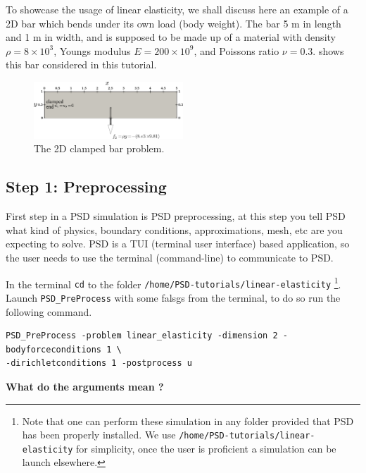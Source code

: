 \newcommand{\psd}[1]{{\small\color{blue!60}\texttt{#1}}}

To showcase the usage of linear elasticity, we shall discuss here an
example of a 2D bar which bends under its own load (body weight). The
bar 5 m in length and 1 m in width, and is supposed to be made up of a
material with density \(\rho=8\times 10^3\), Youngs modulus
\(E=200\times 10^9\), and Poissons ratio \(\nu=0.3\).
 shows this bar considered in this tutorial.

\begin{figure}[h!]
\centering
\includegraphics[width=0.5\textwidth]{./Images/le-2d-bar.png}
\caption{The 2D clamped bar problem. \label{2dbar-le-full}}
\end{figure}

\subsection{Step 1: Preprocessing}

First step in a PSD simulation is PSD preprocessing, at this step you
tell PSD what kind of physics, boundary conditions, approximations,
mesh, etc are you expecting to solve. PSD is a TUI (terminal user
interface) based application, so the user needs to use the terminal
(command-line) to communicate to PSD.

In the terminal \psd{cd} to the folder
\psd{/home/PSD-tutorials/linear-elasticity}
\footnote{Note that one can perform these simulation in any folder provided that PSD has been properly installed. We use \psd{/home/PSD-tutorials/linear-elasticity} for simplicity, once the user is proficient a simulation can be launch elsewhere.}.
Launch \psd{PSD\_PreProcess} with some falsgs from the terminal, to do
so run the following command.

\begin{lstlisting}[style=BashInputStyle]
PSD_PreProcess -problem linear_elasticity -dimension 2 -bodyforceconditions 1 \
-dirichletconditions 1 -postprocess u
\end{lstlisting}

\textbf{What do the arguments mean ?}

